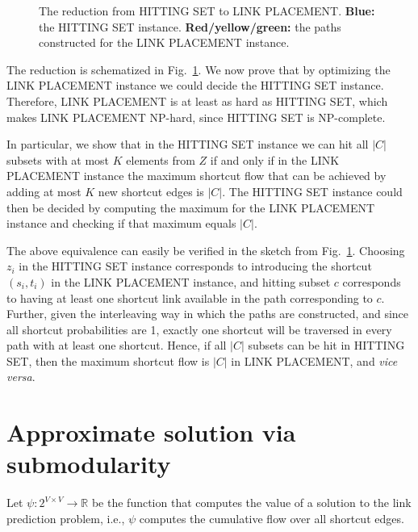 \documentclass[11pt,letterpaper]{article}
\newcommand{\LP}{LINK PLACEMENT}
\newcommand{\HS}{HITTING SET}
\newcommand{\reals}{\mathbb{R}}
\begin{document}
\begin{figure}

\caption{The reduction from HITTING SET to LINK PLACEMENT.
{\bf Blue:} the HITTING SET instance.
{\bf Red/yellow/green:} the paths constructed for the LINK PLACEMENT instance.
}
 \label{fig:reduction}
\end{figure}

The reduction is schematized in Fig.~\ref{fig:reduction}.
We now prove that by optimizing the \LP{} instance we could decide the \HS{} instance.
Therefore, \LP{} is at least as hard as \HS{}, which makes \LP{} NP-hard, since \HS{} is NP-complete.

In particular, we show that in the \HS{} instance we can hit all $|C|$ subsets with at most $K$ elements from $Z$ if and only if in the \LP{} instance the maximum shortcut flow that can be achieved by adding at most $K$ new shortcut edges is $|C|$.
The \HS{} instance could then be decided by computing the maximum for the \LP{} instance and checking if that maximum equals $|C|$.

The above equivalence can easily be verified in the sketch from Fig.~\ref{fig:reduction}.
Choosing $z_i$ in the \HS{} instance corresponds to introducing the shortcut $(s_i,t_i)$ in the \LP{} instance, and hitting subset $c$ corresponds to having at least one shortcut link available in the path corresponding to $c$.
Further, given the interleaving way in which the paths are constructed, and since all shortcut probabilities are 1, exactly one shortcut will be traversed in every path with at least one shortcut.
Hence, if all $|C|$ subsets can be hit in \HS{}, then the maximum shortcut flow is $|C|$ in \LP{}, and {\it vice versa}.



\section{Approximate solution via submodularity}

Let $\psi : 2^{V \times V} \rightarrow \reals$ be the function that computes the value of a solution to the link prediction problem, i.e., $\psi$ computes the cumulative flow over all shortcut edges.
\end{document}
